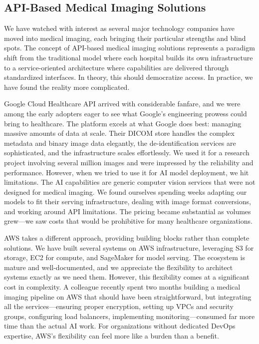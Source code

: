 \documentclass[12pt,a4paper]{article}
\begin{document}
\subsection{API-Based Medical Imaging Solutions}

We have watched with interest as several major technology companies have moved into medical imaging, each bringing their particular strengths and blind spots. The concept of API-based medical imaging solutions represents a paradigm shift from the traditional model where each hospital builds its own infrastructure to a service-oriented architecture where capabilities are delivered through standardized interfaces. In theory, this should democratize access. In practice, we have found the reality more complicated.

Google Cloud Healthcare API arrived with considerable fanfare, and we were among the early adopters eager to see what Google's engineering prowess could bring to healthcare. The platform excels at what Google does best: managing massive amounts of data at scale. Their DICOM store handles the complex metadata and binary image data elegantly, the de-identification services are sophisticated, and the infrastructure scales effortlessly. We used it for a research project involving several million images and were impressed by the reliability and performance. However, when we tried to use it for AI model deployment, we hit limitations. The AI capabilities are generic computer vision services that were not designed for medical imaging. We found ourselves spending weeks adapting our models to fit their serving infrastructure, dealing with image format conversions, and working around API limitations. The pricing became substantial as volumes grew—we saw costs that would be prohibitive for many healthcare organizations.

AWS takes a different approach, providing building blocks rather than complete solutions. We have built several systems on AWS infrastructure, leveraging S3 for storage, EC2 for compute, and SageMaker for model serving. The ecosystem is mature and well-documented, and we appreciate the flexibility to architect systems exactly as we need them. However, this flexibility comes at a significant cost in complexity. A colleague recently spent two months building a medical imaging pipeline on AWS that should have been straightforward, but integrating all the services—ensuring proper encryption, setting up VPCs and security groups, configuring load balancers, implementing monitoring—consumed far more time than the actual AI work. For organizations without dedicated DevOps expertise, AWS's flexibility can feel more like a burden than a benefit.
\end{document}
